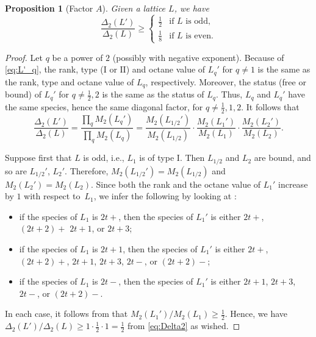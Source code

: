 \documentclass[a4paper]{amsart}
\theoremstyle{definition}
\theoremstyle{plain}
\newtheorem{proposition}[definition]{Proposition}
\newcommand{\I}{\mathrm{I}}
\newcommand{\II}{\mathrm{II}}
\begin{document}
\begin{proposition}[Factor \(A\)] \label{prop:factor.A}
    Given a lattice \(L\), we have
    \[
        \frac{\Delta_2(L')}{\Delta_2(L)} \geq \begin{cases} \tfrac{1}{2} & \text{if \(L\) is odd,} \\ \tfrac{1}{8} & \text{if \(L\) is even.} \end{cases}        
    \]
\end{proposition}
\begin{proof}
    Let \(q\) be a power of \(2\) (possibly with negative exponent). Because of \eqref{eq:L'_q}, the rank, type (\(\I\) or \(\II\)) and octane value of \(L_q'\) for \(q \neq 1\) is the same as the rank, type and octane value of \(L_q\), respectively. 
    Moreover, the status (free or bound) of \(L_q'\) for \(q \neq \tfrac 12, 2\) is the same as the status of \(L_q\). Thus, \(L_q\) and \(L_q'\) have the same species, hence the same diagonal factor, for \(q \neq \tfrac 12, 1, 2\). It follows that
    \begin{equation} \label{eq:Delta2}
        \frac{\Delta_2(L')}{\Delta_2(L)} = \frac{\prod_q M_2(L_q')}{\prod_q M_2(L_q)} = 
        \frac{M_2(L_{1/2}')}{M_2(L_{1/2})} \cdot \frac{M_2(L_{1}')}{M_2(L_{1})} \cdot \frac{M_2(L_{2}')}{M_2(L_{2})}.
    \end{equation}
    
    Suppose first that \(L\) is odd, i.e., \(L_1\) is of type \(\I\). Then \(L_{1/2}\) and \(L_2\) are bound, and so are \(L_{1/2}'\), \(L_2'\). Therefore, \(M_2(L_{1/2}') = M_2(L_{1/2})\) and \(M_2(L_{2}') = M_2(L_{2})\). Since both the rank and the octane value of \(L_1'\) increase by \(1\) with respect to~\(L_1\), we infer the following by looking at \cite[Table~1]{ConwaySloane88}:
    \begin{itemize}
        \item if the species of \(L_1\) is \(2t+\), then the species of \(L_1'\) is either \(2t+\), \((2t+2)+\) \(2t+1\), or \(2t+3\);
        \item if the species of \(L_1\) is \(2t+1\), then the species of \(L_1'\) is either \(2t+\), \((2t+2)+\), \(2t+1\), \(2t+3\), \(2t-\), or \((2t+2)-\);
        \item if the species of \(L_1\) is \(2t-\), then the species of \(L_1'\) is either \(2t+1\), \(2t+3\), \(2t-\), or \((2t+2)-\).
    \end{itemize}
    In each case, it follows from  that \(M_2(L_1')/M_2(L_1) \geq \frac 12 \). Hence, we have \(\Delta_2(L')/\Delta_2(L) \geq 1\cdot \frac 12 \cdot 1 = \frac 12\) from \eqref{eq:Delta2} as wished.


\end{proof}
\end{document}
